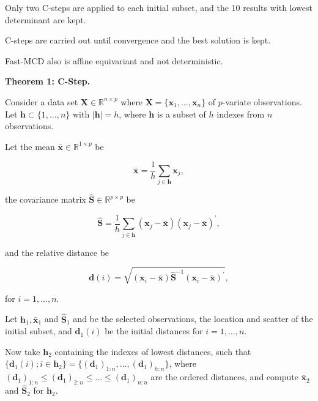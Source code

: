 \documentclass[review]{elsarticle}
\begin{document}
Only two C-steps are applied to each initial subset, and the 10 results with lowest determinant are kept.

C-steps are carried out until convergence and the best solution is kept.

Fast-MCD also is affine equivariant and not deterministic.
	
\textbf{Theorem 1: C-Step.} 

Consider a data set $\boldsymbol{X} \in \mathbb{R}^{n \times p}$ where $\boldsymbol{X} = \{\boldsymbol{x}_1,...,\boldsymbol{x}_n\}$ of $p$-variate observations. Let $\boldsymbol{h} \subset \{1,...,n\}$ with $|\boldsymbol{h}| = h$, where $\boldsymbol{h}$ is a subset of $h$ indexes from $n$ observations.

Let the mean $\bar{\boldsymbol{x}} \in \mathbb{R}^{1 \times p}$ be

\begin{equation}\label{eq:eq02}
	\bar{\boldsymbol{x}} = \displaystyle\frac{1}{h}\displaystyle\sum_{j\in \boldsymbol{h}} \boldsymbol{x}_j, 
\end{equation}

the covariance matrix $\boldsymbol{\hat{S}} \in \mathbb{R}^{p \times p}$ be

\begin{equation}\label{eq:eq03}
	\boldsymbol{\hat{S}} = \displaystyle\frac{1}{h}\displaystyle\sum_{j\in \boldsymbol{h}} (\boldsymbol{x}_j - \bar{\boldsymbol{x}})(\boldsymbol{x}_j - \bar{\boldsymbol{x}})^\prime,
\end{equation}

and the relative distance be 	

\begin{equation}\label{eq:eq04}
	\boldsymbol{d}(i) = \sqrt{(\boldsymbol{x}_i - \bar{\boldsymbol{x}}) \boldsymbol{\hat{S}}^{-1}(\boldsymbol{x}_i - \bar{\boldsymbol{x}})^\prime}, 
\end{equation}

for $i = 1,...,n$.

Let $\boldsymbol{h}_1, \bar{\boldsymbol{x}}_1$ and $\boldsymbol{\hat{S}}_1$ and be the selected observations, the location and scatter of the initial subset, and $\boldsymbol{d}_1(i)$ be the initial distances for $i = 1,...,n$. 

Now take $\boldsymbol{h}_2$ containing the indexes of lowest distances, such that $\{\boldsymbol{d}_1(i); i \in \boldsymbol{h}_2\} = \{(\boldsymbol{d}_1)_{1:n},...,(\boldsymbol{d}_1)_{h:n}\}$, where $(\boldsymbol{d}_1)_{1:n} \leq (\boldsymbol{d}_1)_{2:n} \leq ... \leq (\boldsymbol{d}_1)_{n:n}$ are the ordered distances, and compute $\boldsymbol{\bar{x}}_2$ and $\boldsymbol{\hat{S}}_2$ for $\boldsymbol{h}_2$.
	
\end{document}
